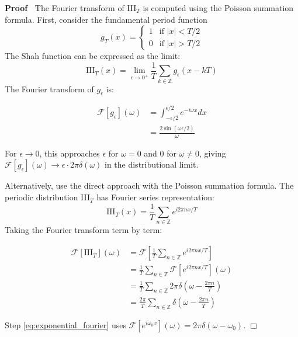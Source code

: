 \documentclass{article}
\newcommand{\tmrsub}[1]{\ensuremath{_{\textrm{#1}}}}
\newenvironment{proof}{\noindent\textbf{Proof\ }}{\hspace*{\fill}$\Box$\medskip}
\begin{document}
\begin{proof}
  The Fourier transform of III\tmrsub{$T$} is computed using the Poisson
  summation formula. First, consider the fundamental period function
  \begin{equation}
    \label{eq:fundamental_period} g_T (x) = \left\{\begin{array}{ll}
      1 & \text{if } |x| < T / 2\\
      0 & \text{if } |x| > T / 2
    \end{array}\right.
  \end{equation}
  The Shah function can be expressed as the limit:
  \begin{equation}
    \label{eq:shah_as_limit} \text{III}_T (x) = \lim_{\epsilon \to 0^+} 
    \frac{1}{T}  \sum_{k \in \mathbb{Z}} g_{\epsilon}  (x - kT)
  \end{equation}
  The Fourier transform of $g_{\epsilon}$ is:
  
  \begin{align}
    \mathcal{F} [g_{\epsilon}] (\omega) & = \int_{- \epsilon / 2}^{\epsilon /
    2} e^{- i \omega x} dx  \label{eq:g_epsilon_fourier}\\
    & = \frac{2 \sin (\omega \epsilon / 2)}{\omega}  \label{eq:sinc_result}
  \end{align}
  
  For $\epsilon \to 0$, this approaches $\epsilon$ for $\omega = 0$ and $0$
  for $\omega \neq 0$, giving $\mathcal{F} [g_{\epsilon}] (\omega) \to
  \epsilon \cdot 2 \pi \delta (\omega)$ in the distributional limit.
  
  Alternatively, use the direct approach with the Poisson summation formula.
  The periodic distribution III\tmrsub{$T$} has Fourier series representation:
  \begin{equation}
    \label{eq:fourier_series_shah} \text{III}_T (x) = \frac{1}{T}  \sum_{n \in
    \mathbb{Z}} e^{i 2 \pi nx / T}
  \end{equation}
  Taking the Fourier transform term by term:
  
  \begin{align}
    \mathcal{F} [\text{III}_T] (\omega) & =\mathcal{F} \left[ \frac{1}{T} 
    \sum_{n \in \mathbb{Z}} e^{i 2 \pi nx / T} \right] 
    \label{eq:fourier_series_transform}\\
    & = \frac{1}{T}  \sum_{n \in \mathbb{Z}} \mathcal{F} [e^{i 2 \pi nx / T}]
    (\omega)  \label{eq:linearity_fourier}\\
    & = \frac{1}{T}  \sum_{n \in \mathbb{Z}} 2 \pi \delta \left( \omega -
    \frac{2 \pi n}{T} \right)  \label{eq:exponential_fourier}\\
    & = \frac{2 \pi}{T}  \sum_{n \in \mathbb{Z}} \delta \left( \omega -
    \frac{2 \pi n}{T} \right)  \label{eq:factor_out_2pi}
  \end{align}
  
  Step \eqref{eq:exponential_fourier} uses $\mathcal{F} [e^{i \omega_0 x}]
  (\omega) = 2 \pi \delta (\omega - \omega_0)$.
\end{proof}
\end{document}
